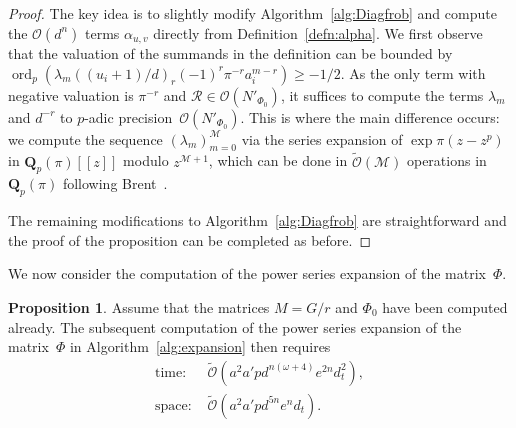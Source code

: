 \documentclass[a4paper,11pt]{article}
\numberwithin{equation}{section}
\newcommand{\QQ}{\mathbf{Q}} %
\DeclareMathOperator{\ord}{ord}          %
\providecommand{\BigOh}{\mathcal{O}}          %
\providecommand{\SoftOh}{\tilde{\mathcal{O}}} %
\theoremstyle{definition}
\newtheorem{prop}[thm]{Proposition}
\begin{document}
\begin{proof}
The key idea is to slightly modify Algorithm~\ref{alg:Diagfrob} 
and compute the $\BigOh(d^n)$ terms $\alpha_{u,v}$ directly from 
Definition~\ref{defn:alpha}.  We first observe that the valuation 
of the summands in the definition can be bounded by 
$\ord_p(\lambda_m ((u_i+1)/d)_r (-1)^r \pi^{-r} a_i^{m-r}) \geq -1/2$. 
As the only term with negative valuation is $\pi^{-r}$ and 
$\mathcal{R} \in \BigOh(N'_{\Phi_0})$, it suffices 
to compute the terms $\lambda_m$ and $d^{-r}$ to $p$-adic 
precision~$\BigOh(N'_{\Phi_0})$.  This is where the main 
difference occurs:  we compute the sequence 
$(\lambda_m)_{m=0}^{\mathcal{M}}$ via the series expansion of 
$\exp \pi (z - z^p)$ in $\QQ_p(\pi)[[z]]$ modulo $z^{\mathcal{M}+1}$, 
which can be done in $\SoftOh(\mathcal{M})$ operations in $\QQ_p(\pi)$ 
following Brent~\citep{Brent1976}.

The remaining modifications to Algorithm~\ref{alg:Diagfrob} are 
straightforward and the proof of the proposition can be completed 
as before.
\end{proof}

We now consider the computation of the power series expansion of the 
matrix~$\Phi$.

\begin{prop}
Assume that the matrices $M = G/r$ and $\Phi_0$ have been computed already.
The subsequent computation of the power series expansion of the matrix~$\Phi$ 
in Algorithm~\ref{alg:expansion} then requires
\begin{align*}
\mbox{time: }  &\SoftOh(a^2 a' p d^{n(\omega+4)}e^{2n} d_t^2), \\
\mbox{space: } &\SoftOh(a^2 a' p d^{5n} e^n d_t).
\end{align*}
\end{prop}
\end{document}
